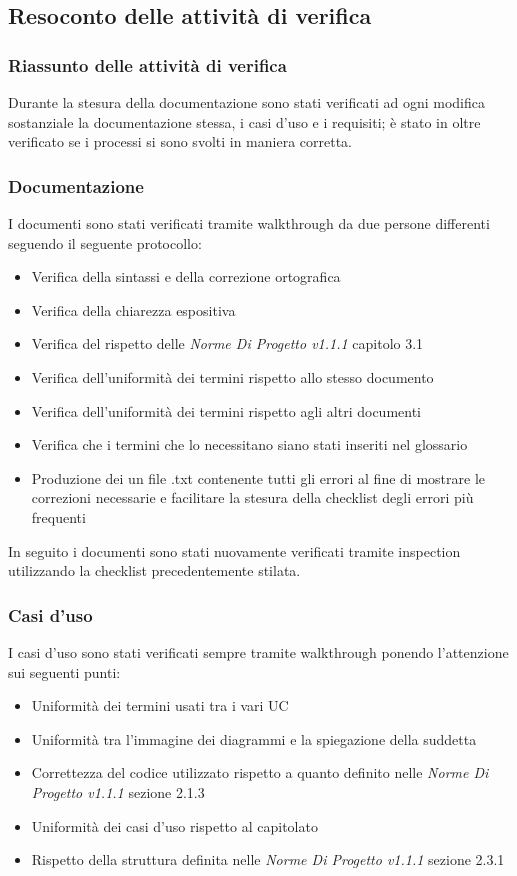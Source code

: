 \documentclass[a4paper]{article}
\begin{document}
				\subsection{Resoconto delle attività di verifica}
				\subsubsection{Riassunto delle attività di verifica}
			Durante la stesura della documentazione sono stati verificati ad ogni modifica sostanziale la documentazione stessa, i
			casi d'uso e i requisiti; è stato in oltre verificato se i processi si sono svolti in maniera corretta.
			\subsubsection{Documentazione}
				I documenti sono stati verificati tramite walkthrough da due persone differenti seguendo il seguente protocollo:
				\begin{itemize}
					\item Verifica della sintassi e della correzione ortografica
					\item Verifica della chiarezza espositiva
					\item Verifica del rispetto delle \emph{Norme Di Progetto v1.1.1} capitolo 3.1
					\item Verifica dell'uniformità dei termini rispetto allo stesso documento
					\item Verifica dell'uniformità dei termini rispetto agli altri documenti
					\item Verifica che i termini che lo necessitano siano stati inseriti nel glossario
					\item Produzione dei un file .txt contenente tutti gli errori al fine di mostrare le correzioni necessarie e
					facilitare la stesura della checklist degli errori più frequenti
				\end{itemize}
				In seguito i documenti sono stati nuovamente verificati tramite inspection utilizzando la checklist precedentemente
				stilata.
			
			\subsubsection{Casi d'uso}
				I casi d'uso sono stati verificati sempre tramite walkthrough ponendo l'attenzione sui seguenti punti:
				\begin{itemize}
					\item Uniformità dei termini usati tra i vari UC
					\item Uniformità tra l'immagine dei diagrammi e la spiegazione della suddetta
					\item Correttezza del codice utilizzato rispetto a quanto definito nelle \emph{Norme Di Progetto v1.1.1} sezione
					2.1.3
					\item Uniformità dei casi d'uso rispetto al capitolato
					\item Rispetto della struttura definita nelle \emph{Norme Di Progetto v1.1.1} sezione 2.3.1
				\end{itemize}
\end{document}
